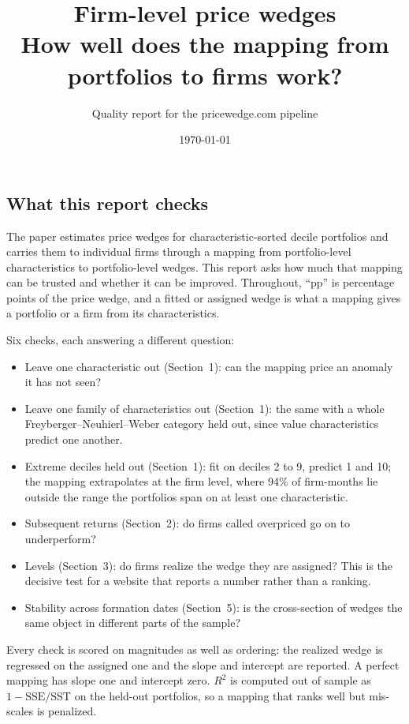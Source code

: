 \documentclass[11pt]{article}
\title{Firm-level price wedges\\[2pt]\large How well does the mapping from portfolios to firms work?}
\author{Quality report for the pricewedge.com pipeline}\date{\today}
\begin{document}
\maketitle

\subsection*{What this report checks}

The paper estimates price wedges for characteristic-sorted decile portfolios
and carries them to individual firms through a mapping from portfolio-level
characteristics to portfolio-level wedges. This report asks how much that
mapping can be trusted and whether it can be improved. Throughout, ``pp''
is percentage points of the price wedge, and a fitted or assigned wedge is
what a mapping gives a portfolio or a firm from its characteristics.

Six checks, each answering a different question:
\begin{itemize}[nosep]
\item Leave one characteristic out (Section~1): can the mapping price an
anomaly it has not seen?
\item Leave one family of characteristics out (Section~1): the same with a
whole Freyberger--Neuhierl--Weber category held out, since value
characteristics predict one another.
\item Extreme deciles held out (Section~1): fit on deciles 2 to 9, predict 1
and 10; the mapping extrapolates at the firm level, where 94\% of
firm-months lie outside the range the portfolios span on at least one
characteristic.
\item Subsequent returns (Section~2): do firms called overpriced go on to
underperform?
\item Levels (Section~3): do firms realize the wedge they are assigned? This
is the decisive test for a website that reports a number rather than a
ranking.
\item Stability across formation dates (Section~5): is the cross-section of
wedges the same object in different parts of the sample?
\end{itemize}
Every check is scored on magnitudes as well as ordering: the realized wedge
is regressed on the assigned one and the slope and intercept are reported.
A perfect mapping has slope one and intercept zero. $R^2$ is computed out of
sample as $1 - \mathrm{SSE}/\mathrm{SST}$ on the held-out portfolios, so a
mapping that ranks well but mis-scales is penalized.
\end{document}
